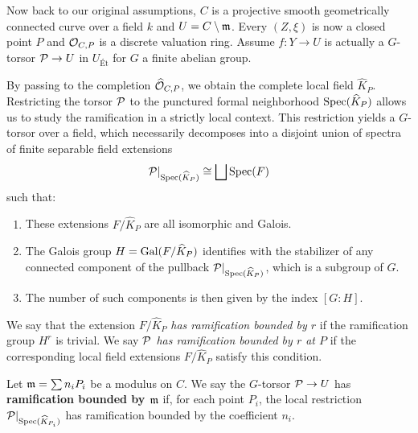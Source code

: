Now back to our original assumptions, $C$ is a projective smooth geometrically connected curve
over a field $k$ and $U=C\setminus \mathfrak{m}$. Every $(Z, \xi)$ is now a closed point $P$ and $\mathcal{O}_{C, P}$ is a discrete valuation ring.
Assume $f: Y \to U$ is actually a $G$-torsor $\mathcal{P} \to U$ in $U_{\text{\'Et}}$ for $G$ a finite abelian group.

By passing to the completion $\widehat{\mathcal{O}}_{C,P}$, we obtain the complete local field $\widehat{K}_P$.
Restricting the torsor $\mathcal{P}$ to the punctured formal neighborhood $\operatorname{Spec}(\widehat{K}_P)$
 allows us to study the ramification in a strictly local context.
 This restriction yields a $G$-torsor over a field, which necessarily decomposes into a disjoint union of spectra of finite separable field extensions
 $$ \mathcal{P}|_{\operatorname{Spec}(\widehat{K}_P)} \cong \bigsqcup \operatorname{Spec}(F) $$
 such that:
 \begin{enumerate}
    \item These extensions $F/\widehat{K}_P$ are all isomorphic and Galois.
    \item The Galois group $H = \operatorname{Gal}(F/\widehat{K}_P)$ identifies with the stabilizer of any connected component of the pullback $\mathcal{P}|_{\operatorname{Spec}(\widehat{K}_P)}$,
     which is a subgroup of $G$.
    \item  The number of such components is then given by the index $[G:H]$.
 \end{enumerate}

 \begin{definition}\label{definition:local_ramification_boundness}
    We say that the extension $F/\widehat{K}_P$ \textit{has ramification bounded by $r$} if the ramification group $H^r$ is trivial.
    We say \textit{$\mathcal{P}$ has ramification bounded by $r$ at $P$} if the corresponding local field extensions $F/\widehat{K}_P$
    satisfy this condition.
 \end{definition}


\begin{definition}
    Let $\mathfrak{m} = \sum n_i P_i$ be a modulus on $C$. We say the $G$-torsor $\mathcal{P} \to U$ has
    \textbf{ramification bounded by $\mathfrak{m}$} if, for each point $P_i$, the local restriction
    $\mathcal{P}|_{\operatorname{Spec}(\widehat{K}_{P_i})}$ has ramification bounded by the coefficient $n_i$.
\end{definition}

